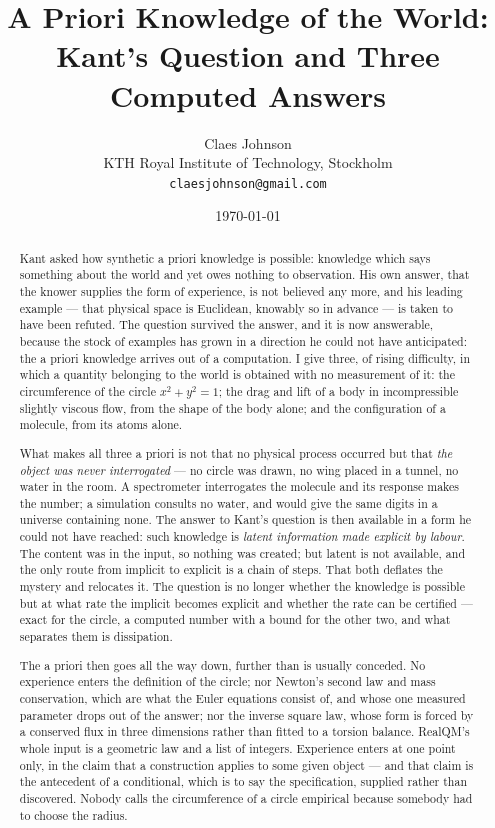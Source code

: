 \documentclass[11pt]{article}
\title{\vspace{-2em}A Priori Knowledge of the World:\\Kant's Question and Three Computed Answers}
\author{Claes Johnson\\[0.3em]
\small KTH Royal Institute of Technology, Stockholm\\
\small \texttt{claesjohnson@gmail.com}}
\date{\today}
\begin{document}
\maketitle

\begin{abstract}
\noindent
Kant asked how synthetic a priori knowledge is possible: knowledge which says something about the
world and yet owes nothing to observation. His own answer, that the knower supplies the form of
experience, is not believed any more, and his leading example --- that physical space is Euclidean,
knowably so in advance --- is taken to have been refuted. The question survived the answer, and it
is now answerable, because the stock of examples has grown in a direction he could not have
anticipated: the a priori knowledge arrives out of a computation. I give three, of rising
difficulty, in which a quantity belonging to the world is obtained with no measurement of it: the
circumference of the circle $x^2+y^2=1$; the drag and lift of a body in incompressible slightly
viscous flow, from the shape of the body alone; and the configuration of a molecule, from its atoms
alone.

What makes all three a priori is not that no physical process occurred but that \emph{the object was
never interrogated} --- no circle was drawn, no wing placed in a tunnel, no water in the room. A
spectrometer interrogates the molecule and its response makes the number; a simulation consults no
water, and would give the same digits in a universe containing none. The answer to Kant's question
is then available in a form he could not have reached: such knowledge is \emph{latent information
made explicit by labour}. The content was in the input, so nothing was created; but latent is not
available, and the only route from implicit to explicit is a chain of steps. That both deflates the
mystery and relocates it. The question is no longer whether the knowledge is possible but at what
rate the implicit becomes explicit and whether the rate can be certified --- exact for the circle, a
computed number with a bound for the other two, and what separates them is dissipation.

The a priori then goes all the way down, further than is usually conceded. No experience enters the
definition of the circle; nor Newton's second law and mass conservation, which are what the Euler
equations consist of, and whose one measured parameter drops out of the answer; nor the inverse
square law, whose form is forced by a conserved flux in three dimensions rather than fitted to a
torsion balance. RealQM's whole input is a geometric law and a list of integers. Experience enters
at one point only, in the claim that a construction applies to some given object --- and that claim
is the antecedent of a conditional, which is to say the specification, supplied rather than
discovered. Nobody calls the circumference of a circle empirical because somebody had to choose the
radius.


\end{abstract}
\end{document}
